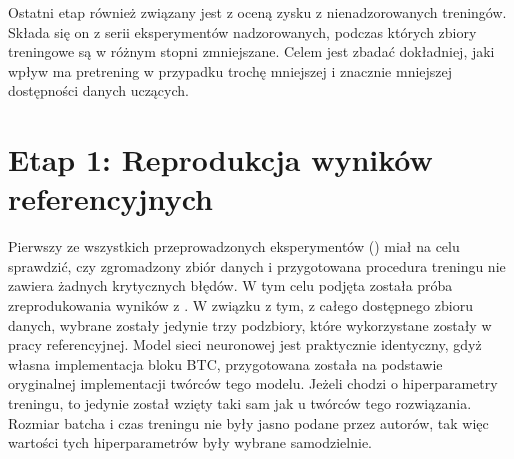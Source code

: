Ostatni etap również związany jest z oceną zysku z nienadzorowanych treningów. Składa się on z serii eksperymentów nadzorowanych, podczas których zbiory treningowe są w różnym stopni zmniejszane. Celem jest zbadać dokładniej, jaki wpływ ma pretrening w przypadku trochę mniejszej i znacznie mniejszej dostępności danych uczących.



\section{Etap 1: Reprodukcja wyników referencyjnych}

Pierwszy ze wszystkich przeprowadzonych eksperymentów () miał na celu sprawdzić, czy zgromadzony zbiór danych i przygotowana procedura treningu nie zawiera żadnych krytycznych błędów. W tym celu podjęta została próba zreprodukowania wyników z \cite{park_bi-directional_2019}. W związku z tym, z całego dostępnego zbioru danych, wybrane zostały jedynie trzy podzbiory, które wykorzystane zostały w pracy referencyjnej. Model sieci neuronowej jest praktycznie identyczny, gdyż własna implementacja bloku BTC, przygotowana została na podstawie oryginalnej implementacji twórców tego modelu. Jeżeli chodzi o hiperparametry treningu, to jedynie  został wzięty taki sam jak u twórców tego rozwiązania. Rozmiar batcha i czas treningu nie były jasno podane przez autorów, tak więc wartości tych hiperparametrów były wybrane samodzielnie.

